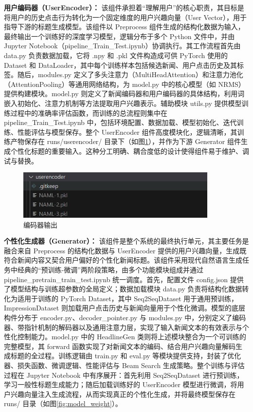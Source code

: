 \documentclass[10pt,a4paper]{article}
\begin{document}
\textbf{用户编码器（UserEncoder）：}
该组件承担着“理解用户”的核心职责，其目标是将用户的历史点击行为转化为一个固定维度的用户兴趣向量（User Vector），用于指导下游的标题生成模型。该组件以 Preprocess 组件生成的结构化数据为输入，最终输出一个训练好的深度学习模型，逻辑分布于多个 Python 文件中，并由 Jupyter Notebook（pipeline\_Train\_Test.ipynb）协调执行。其工作流程首先由 data.py 负责数据加载，它将 .npy 和 .pkl 文件构造成可供 PyTorch 使用的 Dataset 和 DataLoader，其中每个训练样本包括候选新闻、用户点击历史及其标签。随后，modules.py 定义了多头注意力（MultiHeadAttention）和注意力池化（AttentionPooling）等通用网络结构，为 model.py 中的核心模型（如 NRMS）提供构建模块。model.py 则定义了新闻编码器和用户编码器的具体结构，利用词嵌入初始化、注意力机制等方法提取用户兴趣表示。辅助模块 utils.py 提供模型训练过程中的准确率评估函数，而训练的总流程则集中在 pipeline\_Train\_Test.ipynb 中，包括环境配置、数据加载、模型初始化、迭代训练、性能评估与模型保存。整个 UserEncoder 
组件高度模块化，逻辑清晰，其训练产物保存在 runs/userencoder/ 目录下（如图\ref{fig:user_encode}），并作为下游 Generator 组件生成个性化标题的重要输入。这种分工明确、耦合度低的设计使得组件易于维护、调试与替换。

\begin{figure}[H]
  \centering
  \includegraphics[width=10cm]{fig/user_encode.png}
  \caption{编码器输出}\label{fig:user_encode}
\end{figure}

\textbf{个性化生成器（Generator）：}
该组件是整个系统的最终执行单元，其主要任务是融合来自 Preprocess 的结构化数据与 UserEncoder 提供的用户兴趣向量，生成既符合新闻内容又契合用户偏好的个性化新闻标题。该组件采用现代自然语言生成任务中经典的“预训练-微调”两阶段策略，由多个功能模块组成并通过 pipeline\_pretrain\_train\_test.ipynb 统一调度。首先，配置文件 config.json 提供了模型结构与训练超参数的全局定义；数据加载模块 data.py 负责将结构化数据转化为适用于训练的 PyTorch Dataset，其中 Seq2SeqDataset 用于通用预训练，ImpressionDataset 则加载用户点击历史与新闻向量用于个性化微调。模型的底层构件分布于 encoder.py、decoder\_pointer.py 与 modules.py 中，分别定义了编码器、带指针机制的解码器以及通用注意力层，实现了输入新闻文本的有效表示与个性化控制能力。model.py 中的 HeadlineGen 类则将上述模块整合为一个可训练的完整模型，其 forward 函数实现了对新闻文本的编码、结合用户兴趣向量解码生成标题的全过程。训练逻辑由 train.py 和 eval.py 等模块提供支持，封装了优化器、损失函数、微调逻辑、性能评估与 Beam Search 生成策略。整个训练与评估过程在 Jupyter Notebook 中有序展开：首先利用 Seq2SeqDataset 进行预训练，学习一般性标题生成能力；随后加载训练好的 UserEncoder 模型进行微调，将用户兴趣向量注入生成流程，从而实现真正的个性化生成，并将最终模型保存在 runs/ 目录（如图\ref{fig:model_weight}）。
\end{document}
